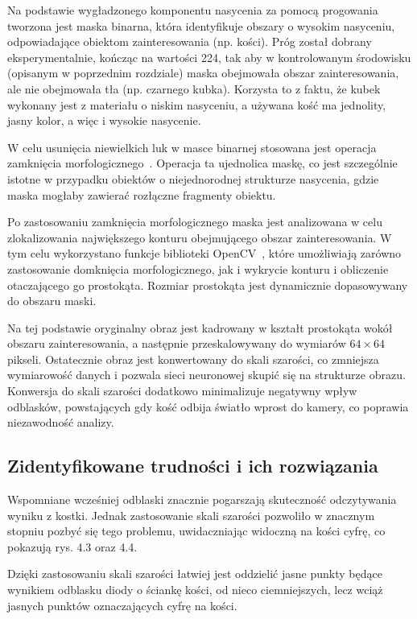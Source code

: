 Na podstawie wygładzonego komponentu nasycenia za pomocą progowania tworzona jest maska binarna,
która identyfikuje obszary o wysokim nasyceniu, odpowiadające obiektom zainteresowania (np. kości).
Próg został dobrany eksperymentalnie, kończąc na wartości 224,
tak aby w kontrolowanym środowisku (opisanym w poprzednim rozdziale) maska obejmowała obszar zainteresowania,
ale nie obejmowała tła (np. czarnego kubka).
Korzysta to z faktu, że kubek wykonany jest z materiału o niskim nasyceniu,
a używana kość ma jednolity, jasny kolor, a więc i wysokie nasycenie.

W celu usunięcia niewielkich luk w masce binarnej stosowana jest operacja zamknięcia morfologicznego~\cite{morphological_closure}.
Operacja ta ujednolica maskę, co jest szczególnie istotne w przypadku obiektów o niejednorodnej strukturze nasycenia,
gdzie maska mogłaby zawierać rozłączne fragmenty obiektu.

Po zastosowaniu zamknięcia morfologicznego maska jest analizowana w celu
zlokalizowania największego konturu obejmującego obszar zainteresowania.
W tym celu wykorzystano funkcje biblioteki OpenCV~\cite{opencv_docs},
które umożliwiają zarówno zastosowanie domknięcia morfologicznego, jak i wykrycie konturu i obliczenie otaczającego go prostokąta.
Rozmiar prostokąta jest dynamicznie dopasowywany do obszaru maski.

Na tej podstawie oryginalny obraz jest kadrowany w kształt prostokąta wokół obszaru zainteresowania,
a następnie przeskalowywany do wymiarów $64 \times 64$ pikseli.
Ostatecznie obraz jest konwertowany do skali szarości, co zmniejsza wymiarowość danych
i pozwala sieci neuronowej skupić się na strukturze obrazu.
Konwersja do skali szarości dodatkowo minimalizuje negatywny wpływ odblasków,
powstających gdy kość odbija światło wprost do kamery, co poprawia niezawodność analizy.



\subsection{Zidentyfikowane trudności i ich rozwiązania}\label{subsec:zidentyfikowane-trudnosci-i-ich-rozwiazania}

Wspomniane wcześniej odblaski znacznie pogarszają skuteczność odczytywania wyniku z kostki.
Jednak zastosowanie skali szarości pozwoliło w znacznym stopniu pozbyć się tego problemu,
uwidaczniając widoczną na kości cyfrę, co pokazują rys. 4.3 oraz 4.4.

Dzięki zastosowaniu skali szarości łatwiej jest oddzielić jasne punkty będące wynikiem odblasku diody o ściankę kości,
od nieco ciemniejszych, lecz wciąż jasnych punktów oznaczających cyfrę na kości.

